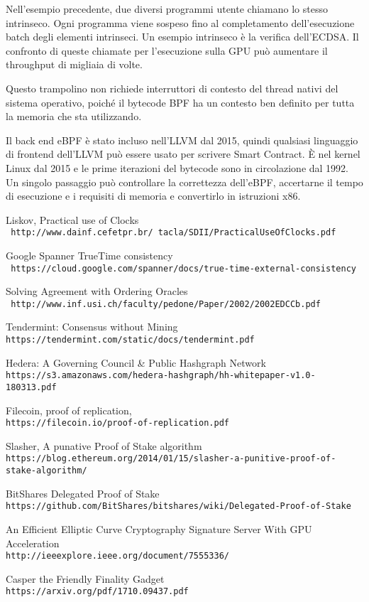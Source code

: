 \documentclass[12pt]{article}
\begin{document}
Nell'esempio precedente, due diversi programmi utente chiamano lo stesso intrinseco. Ogni programma viene sospeso fino al completamento dell'esecuzione batch degli elementi intrinseci. Un esempio intrinseco è la verifica dell'ECDSA. Il confronto di queste chiamate per l'esecuzione sulla GPU può aumentare il throughput di migliaia di volte.

Questo trampolino non richiede interruttori di contesto del thread nativi del sistema operativo, poiché il bytecode BPF ha un contesto ben definito per tutta la memoria che sta utilizzando.

Il back end eBPF è stato incluso nell'LLVM dal 2015, quindi qualsiasi linguaggio di frontend dell'LLVM può essere usato per scrivere Smart Contract. È nel kernel Linux dal 2015 e le prime iterazioni del bytecode sono in circolazione dal 1992. Un singolo passaggio può controllare la correttezza dell'eBPF, accertarne il tempo di esecuzione e i requisiti di memoria e convertirlo in istruzioni x86.




\begin{thebibliography}{9}
Liskov, Practical use of Clocks
\\\texttt{ http://www.dainf.cefetpr.br/~tacla/SDII/PracticalUseOfClocks.pdf}

Google Spanner TrueTime consistency
\\\texttt{ https://cloud.google.com/spanner/docs/true-time-external-consistency}

Solving Agreement with Ordering Oracles
\\\texttt{ http://www.inf.usi.ch/faculty/pedone/Paper/2002/2002EDCCb.pdf}

Tendermint: Consensus without Mining
\\\texttt{https://tendermint.com/static/docs/tendermint.pdf}

Hedera: A Governing Council \& Public Hashgraph Network
\\\texttt{https://s3.amazonaws.com/hedera-hashgraph/hh-whitepaper-v1.0-180313.pdf}

Filecoin, proof of replication,
\\\texttt{https://filecoin.io/proof-of-replication.pdf}

Slasher, A punative Proof of Stake algorithm
\\\texttt{https://blog.ethereum.org/2014/01/15/slasher-a-punitive-proof-of-stake-algorithm/}

BitShares Delegated Proof of Stake
\\\texttt{https://github.com/BitShares/bitshares/wiki/Delegated-Proof-of-Stake}

An Efficient Elliptic Curve Cryptography Signature Server With GPU Acceleration
\\\texttt{http://ieeexplore.ieee.org/document/7555336/}

Casper the Friendly Finality Gadget
\\\texttt{https://arxiv.org/pdf/1710.09437.pdf}
\end{thebibliography}
\end{document}
